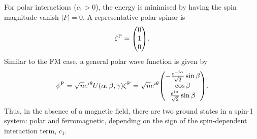 For polar interactions (\(c_1 > 0\)), the energy is minimised by having the
spin magnitude vanish \(|F|=0\).
A representative polar spinor is
\begin{equation}\label{eq: EAP-spinor}
    \zeta^\mathrm{P} = \mqty(0 \\ 1 \\ 0).
\end{equation}
Similar to the FM case, a general polar wave function is given by
\begin{equation}\label{eq: polar-representative-spinor}
    \psi^\mathrm{P} = 
    \sqrt{n}e^{i\theta}U(\alpha, \beta, \gamma)\zeta^\mathrm{P} = 
    \sqrt{n}e^{i\theta}\mqty(
        -\frac{e^{-i\alpha}}{\sqrt{2}}\sin\beta \\
        \cos\beta \\
        \frac{e^{i\alpha}}{\sqrt{2}}\sin\beta
        ).
\end{equation}
Thus, in the absence of a magnetic field, there are two ground states in a
spin-1 system: polar and ferromagnetic, depending on the sign of the
spin-dependent interaction term, \(c_1\).

